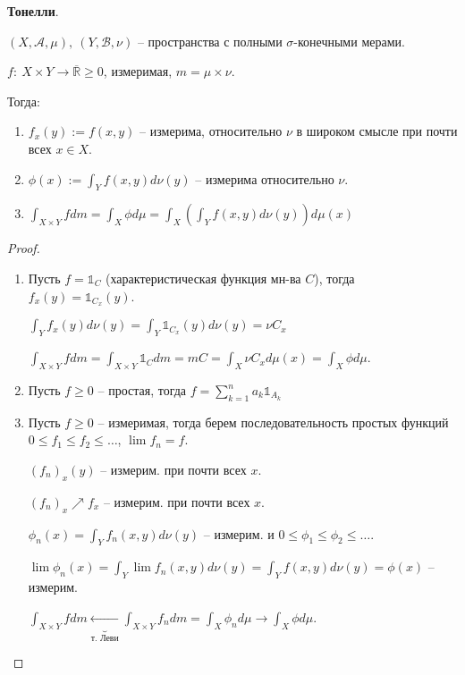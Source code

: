 \begin{theorem}
    \textbf{Тонелли}.

    $(X, \mathcal{A}, \mu), \ (Y, \mathcal{B}, \nu)$ -- пространства с полными $\sigma$-конечными мерами.

    $f: \ X \times Y \rightarrow \overline{\mathbb{R}} \geq 0$, измеримая, $m = \mu \times \nu$.

    Тогда: 
    \begin{enumerate}
        \item {
            $f_x(y) := f(x, y)$ -- измерима, относительно $\nu$ в широком смысле при почти всех $x \in X$.
        }
        \item {
            $\phi(x) := \int_Y { f(x, y) d \nu(y) }$ -- измерима относительно $\nu$.
        }
        \item {
            $\int_{X \times Y} {f d m} = \int_{X} {\phi d \mu} = \int_{X} {\left(\int_{Y} {f(x, y) d \nu(y)}\right) d \mu(x)}$
        }
    \end{enumerate}
\end{theorem}
\begin{proof}
    \begin{enumerate}
        \item {
            Пусть $f = \mathds{1}_C$ (характеристическая функция мн-ва $C$), тогда $f_x(y) = \mathds{1}_{C_x}(y)$.

            $\int_Y {f_x(y)d \nu(y)} = \int_Y {\mathds{1}_{C_x}(y) d \nu(y)} = \nu C_{x}$

            $\int_{X \times Y} {f d m} = \int_{X \times Y} {\mathds{1}_C d m} = m C = \int_X {\nu C_x d \mu(x)} = \int_X {\phi d \mu}$.
        }
        \item {
            Пусть $f \geq 0$ -- простая, тогда $f = \sum_{k=1}^{n} a_k \mathds{1}_{A_k}$
        }
        \item {
            Пусть $f \geq 0$ -- измеримая, тогда берем последовательность простых функций $0 \leq f_1 \leq f_2 \leq \dots$, $\lim{f_n} = f$.

            $(f_n)_x(y)$ -- измерим. при почти всех $x$.

            $(f_n)_x \nearrow f_x$ -- измерим. при почти всех $x$.

            $\phi_n(x) = \int_Y {f_n(x, y) d \nu (y)}$ -- измерим. и $0 \leq \phi_1 \leq \phi_2 \leq \dots$.

            $\lim{\phi_n(x)} = \int_Y{\lim{f_n (x, y)} d \nu(y)} = \int_Y{f(x, y) d \nu(y)} = \phi(x)$ -- измерим.

            $\int_{X \times Y}{f d m} \underbrace{\leftarrow}_{\text{т. Леви}} \int_{X \times Y} {f_n d m} = \int_X {\phi_n d \mu} \rightarrow \int_X{\phi d \mu}$.
        }
    \end{enumerate}
\end{proof}



